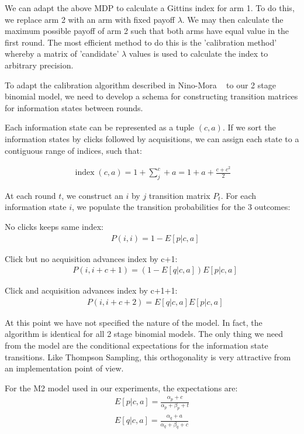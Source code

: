 \documentclass[11pt,a4,singlespacing,titlepagenumber=on]{scrreprt}
\numberwithin{equation}{chapter} %
\theoremstyle{remark}
\begin{document}
We can adapt the above MDP to calculate a Gittins index for arm 1. To do this, we replace arm 2 with an arm with fixed payoff $\lambda$. We may then calculate the maximum possible payoff of arm 2 such that both arms have equal value in the first round. The most efficient method to do this is the 'calibration method' whereby a matrix of 'candidate' $\lambda$ values is used to calculate the index to arbitrary precision.

To adapt the calibration algorithm described in Nino-Mora ~\cite{nino2011computing} to our 2 stage binomial model, we need to develop a schema for constructing transition matrices for information states between rounds.

Each information state can be represented as a tuple $(c,a)$. If we sort the information states by clicks followed by acquisitions, we can assign each state to a contiguous range of indices, such that:

\begin{align}
	\operatorname{index}(c,a) = 1 + \sum_j^c + a = 1 + a + \frac{c + c^2}{2} 
\end{align}

At each round $t$, we construct an $i$ by $j$ transition matrix $P_t$. For each information state $i$, we populate the transition probabilities for the 3 outcomes:

No clicks keeps same index:
\begin{align}
	&P(i,i) = 1 - E[p|c,a]
\end{align}

Click but no acquisition advances index by c+1:
\begin{align}
	&P(i,i+c+1) = (1 - E[q|c,a])E[p|c,a] 
\end{align}

Click and acquisition advances index by c+1+1:
\begin{align}
	&P(i,i+c+2) = E[q|c,a]E[p|c,a] 
\end{align}

At this point we have not specified the nature of the model. In fact, the algorithm is identical for all 2 stage binomial models. The only thing we need from the model are the conditional expectations for the information state transitions. Like Thompson Sampling, this orthogonality is very attractive from an implementation point of view.

For the M2 model used in our experiments, the expectations are:
\begin{align}
	E[p|c,a] = \frac{\alpha_p + c}{\alpha_p + \beta_p + t} \\
	E[q|c,a] = \frac{\alpha_q + a}{\alpha_q + \beta_q + c}
\end{align}
\end{document}
